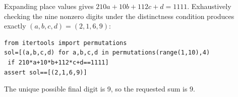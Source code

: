 Expanding place values gives $ 210a+10b+112c+d=1111 $. Exhaustively checking the nine nonzero digits under the distinctness condition produces exactly $(a,b,c,d)=(2,1,6,9)$:
\begin{verbatim}
from itertools import permutations
sol=[(a,b,c,d) for a,b,c,d in permutations(range(1,10),4)
 if 210*a+10*b+112*c+d==1111]
assert sol==[(2,1,6,9)]
\end{verbatim}
The unique possible final digit is 9, so the requested sum is $\boxed9 $.
